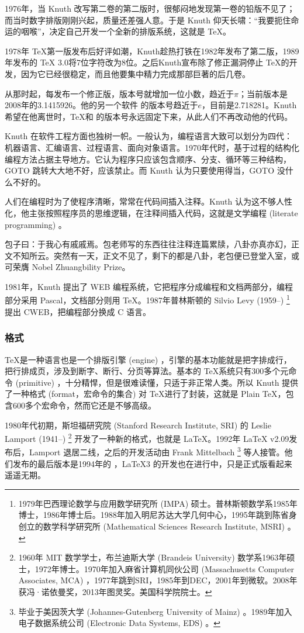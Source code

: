 1976年，当 Knuth 改写第二卷的第二版时，很郁闷地发现第一卷的铅版不见了；而当时数字排版刚刚兴起，质量还差强人意。于是 Knuth 仰天长啸：“我要扼住命运的咽喉”，决定自己开发一个全新的排版系统，这就是 \TeX。

1978年 \TeX 第一版发布后好评如潮，Knuth趁热打铁在1982年发布了第二版，1989年发布的 \TeX{} 3.0将7位字符改为8位。之后Knuth宣布除了修正漏洞停止 \TeX 的开发，因为它已经很稳定，而且他要集中精力完成那部巨著的后几卷。

从那时起，每发布一个修正版，版本号就增加一位小数，趋近于$\pi$；当前版本是2008年的3.1415926。他的另一个软件 \MF 的版本号趋近于$e$，目前是2.718281。Knuth 希望在他离世时，\TeX 和 \MF 的版本号永远固定下来，从此人们不再改动他的代码。

Knuth 在软件工程方面也独树一帜。一般认为，编程语言大致可以划分为四代：机器语言、汇编语言、过程语言、面向对象语言。1970年代时，基于过程的结构化编程方法占据主导地方。它认为程序只应该包含顺序、分支、循环等三种结构，GOTO 跳转大大地不好，应该禁止。而 Knuth 认为只要使用得当，GOTO 没什么不好的。

人们在编程时为了使程序清晰，常常在代码间插入注释。Knuth 认为这不够人性化，他主张按照程序员的思维逻辑，在注释间插入代码，这就是文学编程 (literate programming) 。

包子曰：于我心有戚戚焉。包老师写的东西往往注释连篇累牍，八卦亦真亦幻，正文不知所云。突然有一天，正文不见了，剩下的都是八卦，老包便已登堂入室，或可荣膺 Nobel Zhuangbility Prize。

1981年，Knuth 提出了 WEB 编程系统，它把程序分成编程和文档两部分，编程部分采用 Pascal，文档部分则用 \TeX。1987年普林斯顿的 Silvio Levy (1959--)\indexLevy{} \footnote{1979年巴西理论数学与应用数学研究所 (IMPA) 硕士。普林斯顿数学系1985年博士，1986年博士后。1988年加入明尼苏达大学几何中心，1995年跳到陈省身创立的数学科学研究所 (Mathematical Sciences Research Institute, MSRI) 。} 提出 CWEB，把编程部分换成 C 语言。

\subsubsection{格式}

\TeX 是一种语言也是一个排版引擎 (engine) ，引擎的基本功能就是把字排成行，把行排成页，涉及到断字、断行、分页等算法。基本的 \TeX 系统只有300多个元命令 (primitive) ，十分精悍，但是很难读懂，只适于非正常人类。所以 Knuth 提供了一种格式 (format，宏命令的集合) 对 \TeX 进行了封装，这就是 Plain \TeX ，包含600多个宏命令，然而它还是不够高级。

1980年代初期，斯坦福研究院 (Stanford Research Institute, SRI) 的 Leslie Lamport (1941--)\indexLamport{} \footnote{1960年 MIT 数学学士，布兰迪斯大学 (Brandeis University) 数学系1963年硕士，1972年博士。1970年加入麻省计算机同伙公司 (Massachusetts Computer Associates, MCA) ，1977年跳到SRI，1985年到DEC，2001年到微软。2008年获冯·诺依曼奖，2013年图灵奖。美国科学院院士。} 开发了一种新的格式，也就是 \LaTeX。1992年 \LaTeX{} v2.09发布后，Lamport 退居二线，之后的开发活动由 Frank Mittelbach\indexMittelbach{} \footnote{毕业于美因茨大学 (Johannes-Gutenberg University of Mainz) 。1989年加入电子数据系统公司 (Electronic Data Systems, EDS) 。} 等人接管。他们发布的最后版本是1994年的 \LaTeXe，\LaTeX 3 的开发也在进行中，只是正式版看起来遥遥无期。

